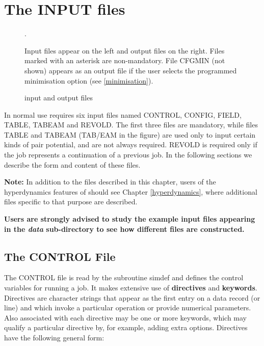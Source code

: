 
\section{The INPUT files}
\label{inputfiles}

\begin{figure}[ht]
\begin{center}
\centerline{}
\caption{\D{}  input and output files}. 
\end{center}
Input files appear on the left and output files on the right. Files
marked with an asterisk are non-mandatory. File CFGMIN (not shown)
appears as an output file if the user selects the programmed
minimisation option (see \ref{minimisation}).
\end{figure}

In normal use \D{} requires six input files named CONTROL, CONFIG, FIELD, TABLE,
TABEAM and REVOLD. The first three files are mandatory, while files TABLE and
TABEAM (TAB/EAM in the figure) are used only to input certain kinds of pair
potential, and are not always required.  REVOLD is required only if the job
represents a continuation of a previous job. In the following sections we
describe the form and content of these files.

{\bf Note:} In addition to the files described in this chapter, users of the
hyperdynamics features of \D{} should see Chapter \ref{hyperdynamics}, where
additional files specific to that purpose are described.

{\bf Users are strongly advised to study the example input files
appearing in the {\em data} sub-directory to see how different files
are constructed.}

\subsection{The CONTROL File}
\label{controlfile}

The CONTROL file is read by the subroutine {\sc simdef} and defines
the control variables for running a \D{} job. It makes extensive use of
{\bf directives} and {\bf keywords}. Directives are character strings
that appear as the first entry on a data record (or line) and which
invoke a particular operation or provide numerical parameters. 
Also associated with each directive may be one or more keywords, which
may qualify a particular directive by, for example, adding extra
options.  
Directives have the following general form:

